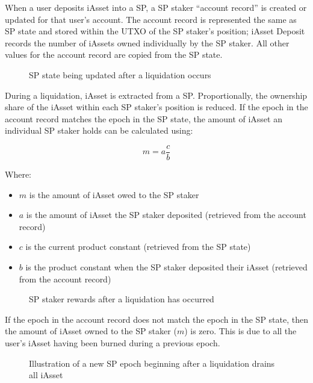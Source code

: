 \documentclass{article}
\begin{document}
\begin{sloppypar}
When a user deposits iAsset into a SP, a SP staker ``account record'' is
created or updated for that user's account. The account record is
represented the same as SP state and stored within the UTXO of the SP
staker's position; iAsset Deposit records the number of iAssets owned
individually by the SP staker. All other values for the account record
are copied from the SP state.

\hypertarget{stability-liquidation}{%
\begin{figure}[htbp]
\centering

\caption{SP state being updated after a liquidation occurs}
\label{stability-liquidation}
\end{figure}}

\filbreak

During a liquidation, iAsset is extracted from a SP. Proportionally, the
ownership share of the iAsset within each SP staker's position is
reduced. If the epoch in the account record matches the epoch in the SP
state, the amount of iAsset an individual SP staker holds can be
calculated using:

\[m = a\frac{c}{b}\]

Where:

\begin{itemize}
\item
  \(m\) is the amount of iAsset owed to the SP staker
\item
  \(a\) is the amount of iAsset the SP staker deposited (retrieved from
  the account record)
\item
  \(c\) is the current product constant (retrieved from the SP state)
\item
  \(b\) is the product constant when the SP staker deposited their
  iAsset (retrieved from the account record)
\end{itemize}

\hypertarget{stability-user-rewards}{%
\begin{figure}[htbp]
\centering

\caption{SP staker rewards after a liquidation has occurred}
\label{stability-user-rewards}
\end{figure}}

If the epoch in the account record does not match the epoch in the SP
state, then the amount of iAsset owned to the SP staker (\(m\)) is zero.
This is due to all the user's iAsset having been burned during a
previous epoch.

\hypertarget{stability-epoch}{%
\begin{figure}[htbp]
\centering

\caption{Illustration of a new SP epoch beginning after
a liquidation drains all iAsset}
\label{stability-epoch}
\end{figure}}


\end{sloppypar}
\end{document}
